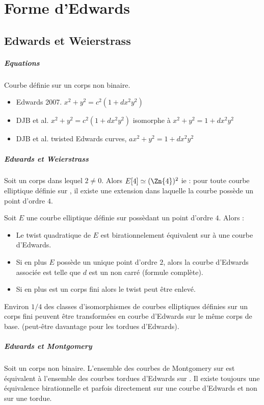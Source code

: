 \chapter{Forme d'Edwards}
\section{Edwards et Weierstrass}
\paragraph{Equations}
Courbe définie sur un corps non binaire.
\begin{itemize}
    \item Edwards 2007. $x^2 + y^2 = c^2(1 + dx^2y^2)$
    \item DJB et al. $x^2 + y^2 = c^2(1 + dx^2y^2)$ isomorphe à $x^2 + y^2 = 1 + dx^2y^2$
    \item DJB et al. twisted Edwards curves, $ax^2 + y^2 = 1 + dx^2y^2$
\end{itemize}


\paragraph{Edwards et Weierstrass}
Soit \field{} un corps dans lequel $2 \neq 0$. Alors $E[4] \simeq (\Zn{4})^2$ ie : pour toute courbe elliptique définie sur \field{}, il existe une extension dans laquelle la courbe possède un point d'ordre $4$.

Soit $E$ une courbe elliptique définie sur \field{} possèdant un point d'ordre $4$. Alors :
\begin{itemize}
    \item Le twist quadratique de $E$ est birationnelement équivalent sur \field{} à une courbe d'Edwards.
    \item Si en plus $E$ possède un unique point d'ordre $2$, alors la courbe d'Edwards associée est telle que $d$ est un non carré (formule complète).
    \item Si en plus \field{} est un corps fini alors le twist peut être enlevé.
\end{itemize}
Environ $1/4$ des classes d'isomorphismes de courbes elliptiques définies sur un corps fini peuvent être transformées en courbe d'Edwards sur le même corps de base. (peut-être davantage pour les tordues d'Edwards).

\paragraph{Edwards et Montgomery}
Soit \field{} un corps non binaire. L'ensemble des courbes de Montgomery sur \field{} est équivalent à l'ensemble des courbes tordues d'Edwards sur \field{}. Il existe toujours une équivalence birationnelle et parfois directement sur une courbe d'Edwards et non sur une tordue. 


